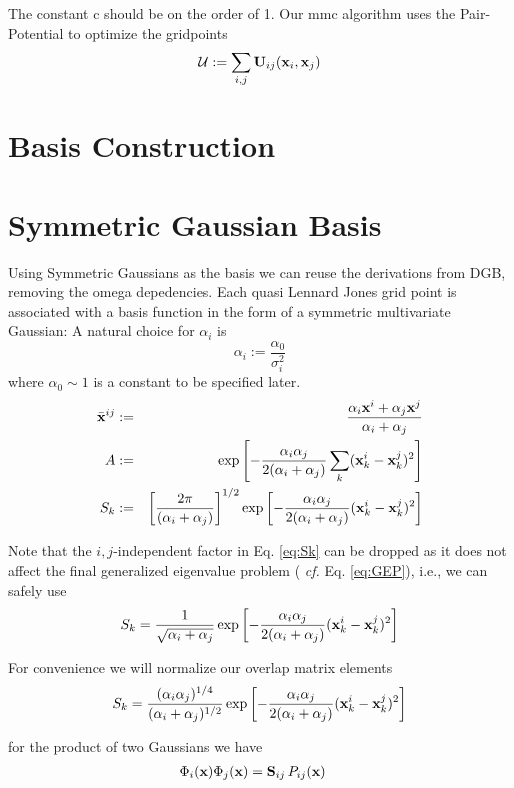 \documentclass[preprint,showpacs,preprintnumbers,amsmath,amssymb]{revtex4}
\newcommand{\be}{\begin{equation}}
\newcommand{\ee}{\end{equation}}
\newcommand{\bea}{\begin{eqnarray}}
\newcommand{\eea}{\end{eqnarray}}
\newcommand{\bbx}{\bar{\mbox{\bf x}}^{ij}}
\newcommand{\bx}{\mbox{\bf x}}        %
\newcommand{\bU}{\mbox{\bf U}}
\newcommand{\bV}{\mbox{\bf V}}
\newcommand{\uu}{\mathcal{U}}
\newcommand{\Eq}{Eq. \ref}
\newcommand{\bS}{\mbox{\bf S}}
\begin{document}
The constant c should be on the order of 1. 
Our mmc algorithm uses the Pair-Potential to optimize the gridpoints
\be
\uu:=\sum_{i,j}\bU_{ij}(\bx_i,\bx_j)
\ee
\section{Basis Construction}
\section*{Symmetric Gaussian Basis}
Using Symmetric Gaussians as the basis we can reuse the derivations from DGB, removing the omega depedencies. 
Each quasi Lennard Jones grid point is associated with a basis function in the form of a symmetric multivariate Gaussian: 
A natural choice for $\alpha_i$  is
\be
    \alpha_i:=\frac{\alpha_0}{\sigma_i^2}
\ee
where $\alpha_0\sim 1$ is a constant to be specified later.
\bea
\bbx &:=& \frac{\alpha_i\bx^i+\alpha_j\bx^j}{\alpha_i+\alpha_j} \\
A &:=& \exp\left[-\frac {\alpha_i\alpha_j}{2(\alpha_i+\alpha_j)}\sum_k(\bx^i_k -\bx^j_k)^2\right]\\\label{eq:Sk}
S_k &:=& \left[\frac{2\pi}{(\alpha_i+\alpha_j)}\right]^{1/2} \exp\left[-\frac {\alpha_i\alpha_j}{2(\alpha_i+\alpha_j)}(\bx^i_k -\bx^j_k)^2\right]
\eea

Note that the $i,j$-independent factor in \Eq{eq:Sk} can be dropped
as it does not affect the final generalized eigenvalue problem ({\it
  cf.} \Eq{eq:GEP}), i.e., we can safely use
\be
S_k = \frac{1}{\sqrt{\alpha_i+\alpha_j}}\exp\left[-\frac {\alpha_i\alpha_j}{2(\alpha_i+\alpha_j)}(\bx^i_k -\bx^j_k)^2\right]
\ee

For convenience we will normalize our overlap matrix elements
\be
S_k=\frac{(\alpha_i\alpha_j)^{1/4}}{(\alpha_i+\alpha_j)^{1/2}}\exp\left[-\frac {\alpha_i\alpha_j}{2(\alpha_i+\alpha_j)}(\bx^i_k -\bx^j_k)^2\right]
\ee

for the product of two Gaussians we have
\be
\begin{split}
\Phi_i(\bx)\Phi_j(\bx)&=\bS_{ij}\, P_{ij}(\bx) 
\end{split}
\ee
\end{document}
